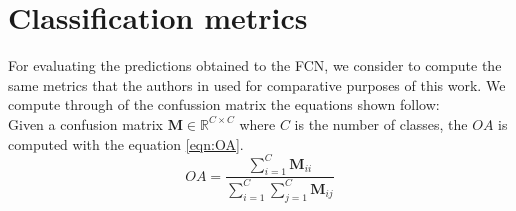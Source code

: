 \documentclass[journal,article,submit,pdftex,moreauthors]{Definitions/mdpi}
\begin{document}




\section[\appendixname~\thesection]{Classification metrics}\label{distance_m} 
For evaluating the predictions obtained to the FCN, we consider to compute the same metrics that the authors in \cite{Russwurm2020} used for comparative purposes of this work. We compute through of the confussion matrix the equations shown follow:\\

Given a confusion matrix $\mathbf{M} \in \mathbb{R}^{C \times C}$ where $C$ is the number of classes, the $OA$ is computed with the equation \ref{eqn:OA}.
\begin{equation}
	\label{eqn:OA}
	OA = \frac{\sum_{i=1}^{C} \mathbf{M}_{ii}}{\sum_{i=1}^{C} \sum_{j=1}^{C} \mathbf{M}_{ij}}
\end{equation}
\end{document}
